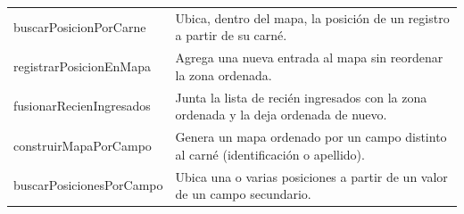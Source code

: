 \begin{longtable}{F{5.7cm} p{9.3cm}}
buscarPosicionPorCarne &
    Ubica, dentro del mapa, la posición de un registro a partir de su carné. \\
registrarPosicionEnMapa &
    Agrega una nueva entrada al mapa sin reordenar la zona ordenada. \\
fusionarRecienIngresados &
    Junta la lista de recién ingresados con la zona ordenada y la deja ordenada de nuevo. \\
construirMapaPorCampo &
    Genera un mapa ordenado por un campo distinto al carné (identificación o apellido). \\
buscarPosicionesPorCampo &
    Ubica una o varias posiciones a partir de un valor de un campo secundario. \\
\bottomrule
\end{longtable}
